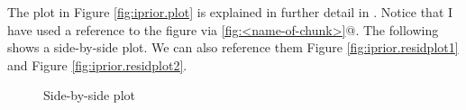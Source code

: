 The plot in Figure \ref{fig:iprior.plot} is explained in further detail in \cite{jamil2017}. Notice that I have used a reference to the figure via \verb@\ref{fig:<name-of-chunk>}@. The following shows a side-by-side plot. We can also reference them Figure \ref{fig:iprior.residplot1} and Figure \ref{fig:iprior.residplot2}.

\begin{knitrout}
\color{fgcolor}\begin{figure}
\caption[Side-by-side plot]{Side-by-side plot}\label{fig:iprior.residplot}
\end{figure}


\end{knitrout}

%
%
%
%


